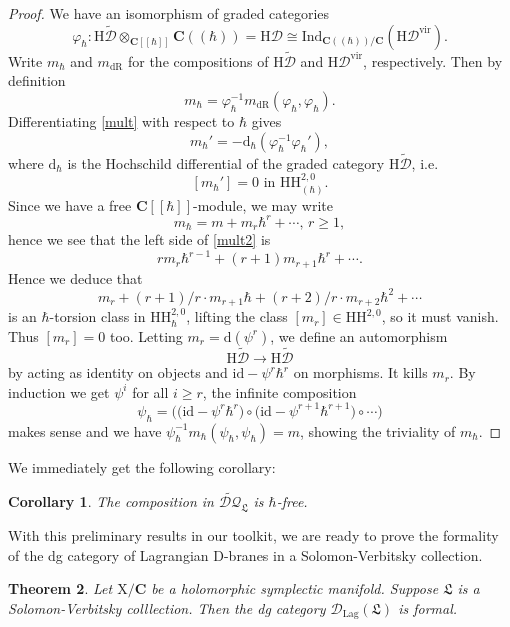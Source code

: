 \documentclass{article}
\theoremstyle{plain}
\newtheorem{theorem}{Theorem}[subsection]   %
\newtheorem{corollary}[theorem]{Corollary}
\theoremstyle{definition}
\theoremstyle{remark}
\newcommand{\mr}{\mathrm}
\newcommand{\C}{\mathbf C}
\newcommand{\brak}{[\![\hbar]\!]}
\newcommand{\cbrak}{(\!(\hbar)\!)}
\newcommand{\3}{\vspace{3mm}}
\newcommand{\2}{\vspace{2mm}}
\newcommand{\1}{\vspace{1mm}}
\begin{document}
\begin{proof}
  We have an isomorphism of graded categories $$\varphi_{\hbar} :\mr{H}\widetilde{\mathcal{D}}\otimes_{\C\brak}\C\cbrak = \mr{H}\mathcal{D}\cong \mr{Ind}_{\C\cbrak/\C}\left(\mr{H}\mathcal{D}^{\mr{vir}}\right).$$ Write $m_{\hbar}$ and $m_{\mr{dR}}$ for the compositions of $\mr{H}\widetilde{\mathcal{D}}$ and $\mr{H}\mathcal{D}^{\mr{vir}}$, respectively. Then by definition
  \begin{equation}\label{mult}
    m_{\hbar} = \varphi_{\hbar}^{-1}m_{\mr{dR}}(\varphi_{\hbar},\varphi_{\hbar}).
  \end{equation}
 Differentiating \eqref{mult} with respect to $\hbar$ gives
 \begin{equation}\label{mult2}
 m_{\hbar}' = -\mr{d}_{\hbar}(\varphi_{\hbar}^{-1}\varphi_{\hbar}'),
 \end{equation}
 where $\mr{d}_{\hbar}$ is the Hochschild differential of the graded category $\mr{H}\widetilde{\mathcal{D}}$, i.e. $$[m_\hbar']=0\text{ in }\mr{HH}^{2,0}_{(\hbar)}.$$ Since we have a free $\C\brak$-module, we may write $$m_{\hbar} = m + m_{r}\hbar^{r} + \cdots,\, r \ge 1,$$ hence we see that the left side of \eqref{mult2} is $$rm_{r}\hbar^{r-1}+(r+1)m_{r+1}\hbar^{r} + \cdots.$$ Hence we deduce that $$m_{r}+(r+1)/r\cdot m_{r+1}\hbar + (r+2)/r\cdot m_{r+2}\hbar^{2} +\cdots$$ is an $\hbar$-torsion class in $\mr{HH}^{2,0}_\hbar$, lifting the class $[m_r] \in \mr{HH}^{2,0}$, so it must vanish. Thus $[m_r]=0$ too. Letting $m_r =\mr{d}(\psi^{r})$, we define an automorphism $$\mr{H}\widetilde{\mathcal{D}}\to \mr{H}\widetilde{\mathcal{D}}$$ by acting as identity on objects and $\mr{id}-\psi^{r}\hbar^r$ on morphisms. It kills $m_r$. By induction we get $\psi^{i}$ for all $i \ge r$, the infinite composition  $$\psi_\hbar = \big(\big(\mr{id}-\psi^{r}\hbar^r\big)\circ \big(\mr{id}-\psi^{r+1}\hbar^{r+1}\big)\circ \cdots \big)$$ makes sense and we have $\psi_\hbar^{-1}m_\hbar(\psi_\hbar,\psi_\hbar) = m$, showing the triviality of $m_\hbar$.
\end{proof}
We immediately get the following corollary:
\2
\begin{corollary}\label{hfree}
The composition in $\widetilde{\mathcal{DQ}}_\mathfrak{L}$ is $\hbar$-free.
\end{corollary}
With this preliminary results in our toolkit, we are ready to prove the formality of the dg category of Lagrangian $\mr{D}$-branes in a Solomon-Verbitsky collection.
\2
\begin{theorem}\label{main1proof}
Let $\mr{X}/\C$ be a holomorphic symplectic manifold. Suppose $\mathfrak{L}$ is a Solomon-Verbitsky colllection. Then the dg category $\mathcal{D}_{\mr{Lag}}(\mathfrak{L})$ is formal.
\end{theorem}
\end{document}
